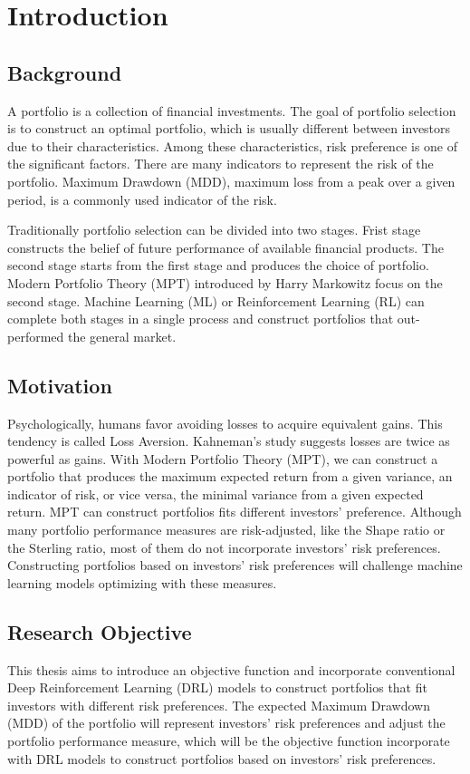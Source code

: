 \chapter{Introduction}
\section {Background}
A portfolio is a collection of financial investments. The goal of portfolio selection is to construct an optimal portfolio, which is usually different between investors due to their characteristics. Among these characteristics, risk preference is one of the significant factors. There are many indicators to represent the risk of the portfolio. Maximum Drawdown (MDD),  maximum loss from a peak over a given period, is a commonly used indicator of the risk.

Traditionally portfolio selection can be divided into two stages. Frist stage constructs the belief of future performance of available financial products. The second stage starts from the first stage and produces the choice of portfolio.  Modern Portfolio Theory (MPT) introduced by  Harry Markowitz \cite{10.2307/2975974} focus on the second stage. Machine Learning (ML) or Reinforcement Learning (RL) can complete both stages in a single process and construct portfolios that out-performed the general market.\cite{KRAUSS2017689}
\section {Motivation}
Psychologically, humans favor avoiding losses to acquire equivalent gains. This tendency is called Loss Aversion.\cite{kahneman2000analysis} Kahneman's study suggests losses are twice as powerful as gains.\cite{Tversky1992} With Modern Portfolio Theory (MPT), we can construct a portfolio that produces the maximum expected return from a given variance, an indicator of risk, or vice versa, the minimal variance from a given expected return.\cite{10.2307/2975974} MPT can construct portfolios fits different investors' preference.
Although many portfolio performance measures are risk-adjusted\cite{cogneau2009101}, like the Shape ratio\cite{Sharpe49} or the Sterling ratio\cite{magdon2004maximum}, most of them do not incorporate investors' risk preferences. Constructing portfolios based on investors' risk preferences will challenge machine learning models optimizing with these measures.

\section {Research Objective}
This thesis aims to introduce an objective function and incorporate conventional Deep Reinforcement Learning (DRL) models to construct portfolios that fit investors with different risk preferences. The expected Maximum Drawdown (MDD) of the portfolio will represent investors' risk preferences and adjust the portfolio performance measure, which will be the objective function incorporate with DRL models to construct portfolios based on investors' risk preferences.
\label{c:intro}

